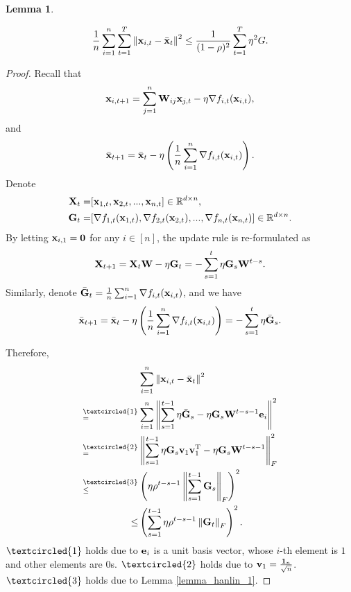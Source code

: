 \documentclass{article}
\newtheorem{Lemma}{\bf{Lemma}}
\begin{document}
\begin{Lemma}
\label{lemma_x_variance_norm_square}

\begin{align}
\nonumber
\frac{1}{n}\sum_{i=1}^n \sum_{t=1}^T \left\lVert{\bf x}_{i,t} - \bar{{\bf x}}_t\right\rVert^2 \le \frac{1}{(1-\rho)^2} \sum_{t=1}^T \eta^2 G.
\end{align}

\end{Lemma}
\begin{proof}


Recall that 
\begin{align}
\nonumber
{\bf x}_{i,t+1} = \sum_{j=1}^n {\bf W}_{ij}{\bf x}_{j,t} - \eta \nabla f_{i,t}({\bf x}_{i,t}),
\end{align} and 
\begin{align}
\nonumber
\bar{{\bf x}}_{t+1} = \bar{{\bf x}}_t - \eta \left( \frac{1}{n}\sum_{i=1}^n \nabla f_{i,t}({\bf x}_{i,t}) \right).
\end{align} Denote 
\begin{align}
\nonumber
{\bf X}_t = &  [{\bf x}_{1,t}, {\bf x}_{2,t}, ..., {\bf x}_{n,t}] \in \mathbb{R}^{d\times n}, \\ \nonumber
{\bf G}_t = & [\nabla f_{1,t}({\bf x}_{1,t}), \nabla f_{2,t}({\bf x}_{2,t}), ..., \nabla f_{n,t}({\bf x}_{n,t})] \in \mathbb{R}^{d\times n}.
\end{align} By letting ${\bf x}_{i,1} = {\bf 0}$ for any $i\in[n]$, the update rule is re-formulated as 
\begin{align}
\nonumber
{\bf X}_{t+1} = {\bf X}_t {\bf W} - \eta {\bf G}_t = - \sum_{s=1}^t \eta {\bf G}_s {\bf W}^{t-s}. 
\end{align} Similarly, denote $\bar{{\bf G}}_t = \frac{1}{n}\sum_{i=1}^n \nabla f_{i,t}({\bf x}_{i,t})$, and we have
\begin{align}
\bar{{\bf x}}_{t+1} = \bar{{\bf x}}_t - \eta \left( \frac{1}{n}\sum_{i=1}^n \nabla f_{i,t}({\bf x}_{i,t}) \right) = - \sum_{s=1}^t \eta \bar{{\bf G}}_s. 
\end{align}


Therefore, 
\begin{align}
\nonumber
& \sum_{i=1}^n \lrnorm{\x_{i,t} - \bar{\x}_t}^2 \\ \nonumber
\refabovecir{=}{\textcircled{1}} & \sum_{i=1}^n \lrnorm{ \sum_{s=1}^{t-1} \eta \bar{\G}_s - \eta \G_s \W^{t-s-1}\e_i }^2   \\ \nonumber
\refabovecir{=}{\textcircled{2}} & \lrnorm{ \sum_{s=1}^{t-1} \eta \G_s\v_1 \v_1\Tr - \eta \G_s \W^{t-s-1} }^2_F   \\ \nonumber
\refabovecir{\le}{\textcircled{3}} & \lrincir{ \eta \rho^{t-s-1} \lrnorm{\sum_{s=1}^{t-1}\G_s}_F}^2 \\ \nonumber
\le & \lrincir{ \sum_{s=1}^{t-1} \eta \rho^{t-s-1} \lrnorm{\G_t}_F}^2.
\end{align} $\textcircled{1}$ holds due to ${\bf e}_i$ is a unit basis vector, whose $i$-th element is $1$ and other elements are $0$s. $\textcircled{2}$ holds due to ${\bf v}_1 = \frac{{\bf 1}_n}{\sqrt{n}}$. $\textcircled{3}$ holds due to Lemma \ref{lemma_hanlin_1}. 


\end{proof}
\end{document}
